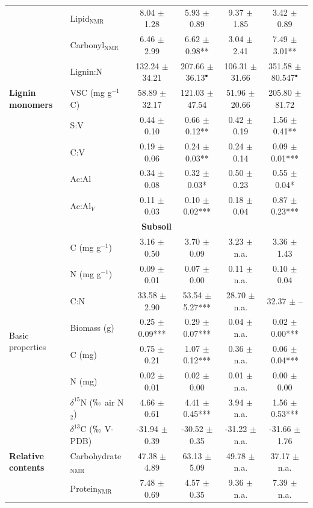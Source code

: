 \begin{table}[htbp]
\begin{tabular}{llcccc}
  & Lipid$_{\text{NMR}}$ & 8.04 $\pm$ 1.28 & 5.93 $\pm$ 0.89 & 9.37 $\pm$ 1.85 & 3.42 $\pm$ 0.89 \\
  & Carbonyl$_{\text{NMR}}$ & 6.46 $\pm$ 2.99 & 6.62 $\pm$ 0.98** & 3.04 $\pm$ 2.41 & 7.49 $\pm$ 3.01** \\
  & Lignin:N & 132.24 $\pm$ 34.21 & 207.66 $\pm$ 36.13$^{\bullet}$ & 106.31 $\pm$ 31.66 & 351.58 $\pm$ 80.547$^{\bullet}$ \\
  \midrule
  \textbf{Lignin monomers} & VSC (mg g$^{-1}$ C) & 58.89 $\pm$ 32.17 & 121.03 $\pm$ 47.54 & 51.96 $\pm$ 20.66 & 205.80 $\pm$ 81.72 \\
  & S:V & 0.44 $\pm$ 0.10 & 0.66 $\pm$ 0.12** & 0.42 $\pm$ 0.19 & 1.56 $\pm$ 0.41** \\
  & C:V & 0.19 $\pm$ 0.06 & 0.24 $\pm$ 0.03** & 0.24 $\pm$ 0.14 & 0.09 $\pm$ 0.01*** \\
  & Ac:Al & 0.34 $\pm$ 0.08 & 0.32 $\pm$ 0.03* & 0.50 $\pm$ 0.23 & 0.55 $\pm$ 0.04* \\
  & Ac:Al$_V$ & 0.11 $\pm$ 0.03 & 0.10 $\pm$ 0.02*** & 0.18 $\pm$ 0.04 & 0.87 $\pm$ 0.23*** \\
  \midrule
  \multicolumn{6}{c}{\textbf{Subsoil}} \\
  \midrule
  \multirow{8}{*}{Basic properties} & C (mg g$^{-1}$) & 3.16 $\pm$ 0.50 & 3.70 $\pm$ 0.09 & 3.23 $\pm$ n.a. & 3.36 $\pm$ 1.43 \\
  & N (mg g$^{-1}$) & 0.09 $\pm$ 0.01 & 0.07 $\pm$ 0.00 & 0.11 $\pm$ n.a. & 0.10 $\pm$ 0.04 \\
  & C:N & 33.58 $\pm$ 2.90 & 53.54 $\pm$ 5.27*** & 28.70 $\pm$ n.a. & 32.37 $\pm$ -- \\
  & Biomass (g) & 0.25 $\pm$ 0.09*** & 0.29 $\pm$ 0.07*** & 0.04 $\pm$ n.a. & 0.02 $\pm$ 0.00*** \\
  & C (mg) & 0.75 $\pm$ 0.21 & 1.07 $\pm$ 0.12*** & 0.36 $\pm$ n.a. & 0.06 $\pm$ 0.04*** \\
  & N (mg) & 0.02 $\pm$ 0.01 & 0.02 $\pm$ 0.00 & 0.01 $\pm$ n.a. & 0.00 $\pm$ 0.00 \\
  & $\delta^{15}$N ($\permil$ air N$_2$) & 4.66 $\pm$ 0.61 & 4.41 $\pm$ 0.45*** & 3.94 $\pm$ n.a. & 1.56 $\pm$ 0.53*** \\
  & $\delta^{13}$C ($\permil$ V-PDB) & -31.94 $\pm$ 0.39 & -30.52 $\pm$ 0.35 & -31.22 $\pm$ n.a. & -31.66 $\pm$ 1.76 \\
  \midrule
  \textbf{Relative contents} & Carbohydrate$_{\text{NMR}}$ & 47.38 $\pm$ 4.89 & 63.13 $\pm$ 5.09 & 49.78 $\pm$ n.a. & 37.17 $\pm$ n.a. \\
  & Protein$_{\text{NMR}}$ & 7.48 $\pm$ 0.69 & 4.57 $\pm$ 0.35 & 9.36 $\pm$ n.a. & 7.39 $\pm$ n.a. \\

\end{tabular}
\end{table}
